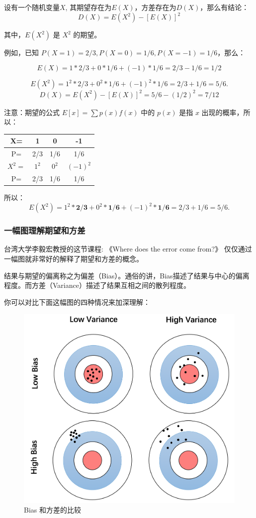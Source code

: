 \documentclass[12pt]{article}
\begin{document}
设有一个随机变量$X$, 其期望存在为$E(X)$，方差存在为$D(X)$，那么有结论：
$$
D(X) = E(X^2) - [E(X)]^2
$$

其中，$E(X^2)$ 是 $X^2$ 的期望。

例如，已知 $P(X=1)= 2/3, P(X=0) = 1/6, P(X=-1) = 1/6$，那么：

$$
E(X) = 1 * 2/3 + 0 * 1/6 +(-1) * 1/6 = 2/3 - 1/6 = 1/2
$$

$$
E(X^2) = 1^2 * 2/3 + 0^2 * 1/6 + (-1)^2 * 1/6 = 2/3 + 1/6 = 5/6.
$$
$$
D(X) = E(X^2) - [E(X)]^2 = 5/6 - (1/2)^2 = 7/12
$$

\begin{framed}
注意：期望的公式 $E[x] = \sum p(x)f(x)$ 中的 $p(x)$ 是指 $x$ 出现的概率，所以：
\begin{table}[H]
    \centering
    \begin{tabular}{|c|c|c|c|}
    \hline 
       X=   &  1 & 0 & -1 \\ 
       \hline
       P=   & 2/3 & 1/6 & 1/6 \\
       \hline\hline
       $X^2=$ & $1^2$ & $0^2$ & $(-1)^2$ \\
       \hline
       P=    & 2/3 & 1/6 & 1/6 \\
       \hline
    \end{tabular}
\end{table}
所以：
$$
E(X^2) = 1^2 * \mathbf{2/3} + 0^2 * \mathbf{1/6} + (-1)^2 * \mathbf{1/6} = 2/3 + 1/6 = 5/6.
$$
\end{framed}


\subsubsection{一幅图理解期望和方差}
台湾大学李毅宏教授的这节课程: 《Where does the error come from?》 仅仅通过一幅图就非常好的解释了期望和方差的概念。

结果与期望的偏离称之为偏差（Bias）。通俗的讲，Bias描述了结果与中心的偏离程度。而方差（Variance）描述了结果互相之间的散列程度。

你可以对比下面这幅图的四种情况来加深理解：
\begin{figure}[H]
  \centering
  \includegraphics[width=.6\textwidth]{fig/bias_variance.png} %
  \caption{Bias 和方差的比较} %
\end{figure}
\end{document}

